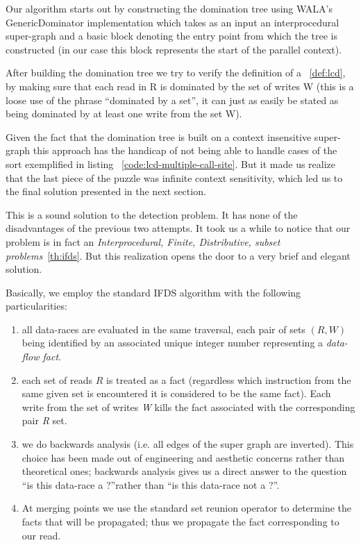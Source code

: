 Our algorithm starts out by constructing the domination tree using WALA's
GenericDominator implementation which takes as an input an interprocedural
super-graph and a basic block denoting the entry point from which the tree is
constructed (in our case this block represents the start of the parallel
context).

After building the domination tree we try to verify the definition of a
\slcd~\ref{def:lcd}, by making sure that each read in R is dominated by the set
of writes W (this is a loose use of the phrase ``dominated by a set'', it can
just as easily be stated as being dominated by at least one write from the set
W).

Given the fact that the domination tree is built on a context
insensitive super-graph this approach has the handicap of not being able to
handle cases of the sort exemplified in listing
~\ref{code:lcd-multiple-call-site}. But it made us realize that the last piece
of the puzzle was infinite context sensitivity, which led us to the final
solution presented in the next section.


This is a sound solution to the \slcd detection problem. It has none of the
disadvantages of the previous two attempts. It took us a while to notice that
our problem is in fact an \emph{Interprocedural, Finite, Distributive, subset
problems}~\ref{th:ifds}. But this realization opens the door to a very brief and
elegant solution.

Basically, we employ the standard IFDS algorithm with the following
particularities:
\begin{enumerate}

\item all data-races are evaluated in the same traversal, each pair of sets
\begin{math}(R,W)\end{math} being identified by an associated unique integer
number representing a \emph{data-flow fact}.

\item each set of reads \begin{math}R\end{math} is treated as a fact
(regardless which instruction from the same given set is encountered it is considered to be the
same fact). Each write from the set of writes \emph{W} kills the fact associated
with the corresponding pair \emph{R} set. 

\item we do backwards analysis (i.e. all edges of the super graph are inverted).
This choice has been made out of engineering and aesthetic concerns rather than
theoretical ones; backwards analysis gives us a direct answer to the question
``is this data-race a \lcd?''rather than ``is this data-race not a \lcd?''.

\item  At merging points we use the standard set reunion operator to determine
the facts that will be propagated; thus we propagate the fact corresponding to
our read.
\end{enumerate}

